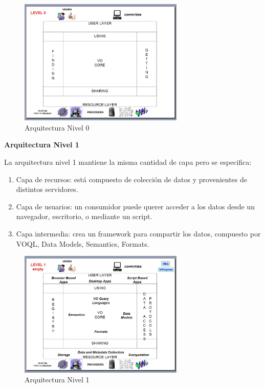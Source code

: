 \begin{figure}[h!t]
    \centering
    \includegraphics[width=0.7\textwidth]{img/arquitectura_0.png}
    \caption{Arquitectura Nivel 0}
    \label{fig:nivel0}
\end{figure}

\textbf{Arquitectura Nivel 1}%


La arquitectura nivel 1 mantiene la misma cantidad de capa pero se especifica:
\begin{enumerate}
    \item Capa de recursos:
          está compuesto de colección de datos y provenientes de distintos
          servidores.
    \item Capa de usuarios:
          un consumidor puede querer acceder a los datos desde un navegador,
          escritorio, o mediante un script.
    \item Capa intermedia:
          crea un framework para compartir los datos, compuesto por VOQL,
          Data Models, Semantics, Formats.
\end{enumerate}

\begin{figure}[h!t]
    \centering
    \includegraphics[width=0.7\textwidth]{img/arquitectura_1.png}
    \caption{Arquitectura Nivel 1}
    \label{fig:nivel1}
\end{figure}

